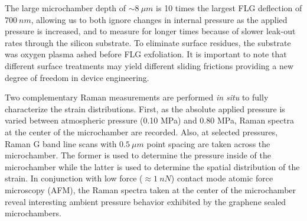 The large microchamber depth of $\sim 8 \ \mu m$ is 10 times the largest FLG deflection of $700 \ nm$, allowing us to both ignore changes in internal pressure as the applied pressure is increased, and to measure for longer times because of slower leak-out rates through the silicon substrate.  To eliminate surface residues, the substrate was oxygen plasma ashed before FLG exfoliation. It is important to note that different surface treatments may yield different sliding frictions providing a new degree of freedom in device engineering. 

Two complementary Raman measurements are performed \emph{in situ} to fully characterize the strain distributions. First, as the absolute applied pressure is varied between atmospheric pressure (0.10 MPa) and 0.80 MPa, Raman spectra at the center of the microchamber are recorded. Also, at selected pressures, Raman G band line scans with $ 0.5 \ \mu m$ point spacing are taken across the microchamber.  The former is used to determine the pressure inside of the microchamber while the latter is used to determine the spatial distribution of the strain.  In conjunction with low force ($\approx 1 \ nN$) contact mode atomic force microscopy (AFM), the Raman spectra taken at the center of the microchamber reveal interesting ambient pressure behavior exhibited by the graphene sealed microchambers.

